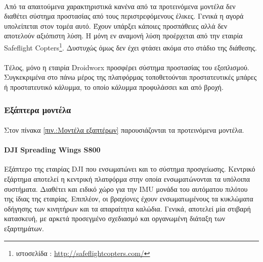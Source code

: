 \documentclass[a4paper, 12pt, twoside]{report}
\begin{document}
{{{{{{			\paragraph{}{Από τα απαιτούμενα χαρακτηριστικά κανένα από τα προτεινόμενα μοντέλα δεν διαθέτει σύστημα προστασίας από τους περιστρεφόμενους έλικες. Γενικά η αγορά υπολείπεται στον τομέα αυτό. Έχουν υπάρξει κάποιες προσπάθειες αλλά δεν αποτελούν αξιόπιστη λύση. Η μόνη εν αναμονή λύση προέρχεται από την εταιρία Safeflight Copters\footnote{ιστοσελίδα : \url{http://safeflightcopters.com/}}. Δυστυχώς όμως δεν έχει φτάσει ακόμα στο στάδιο της διάθεσης.
			}
			\paragraph{}{Τέλος, μόνο η εταιρία Droidworx προσφέρει σύστημα προστασίας του εξοπλισμού. Συγκεκριμένα στο πάνω μέρος της πλατφόρμας τοποθετούνται προστατευτικές μπάρες ή προστατευτικό κάλυμμα, το οποίο κάλυμμα προφυλάσσει και από βροχή.
			}
			
		\subsubsection{Εξάπτερα μοντέλα}
			\paragraph{}{Στον πίνακα \ref{πιν.:Μοντέλα εξαπτέρων} παρουσιάζονται τα προτεινόμενα μοντέλα.
			}
			\paragraph{DJI Spreading Wings S800}{Εξάπτερο της εταιρίας DJI που ενσωματώνει και το σύστημα προσγείωσης. Κεντρικό εξάρτημα αποτελεί η κεντρική πλατφόρμα στην οποία ενσωματώνονται τα υπόλοιπα συστήματα. Διαθέτει και ειδικό χώρο για την IMU μονάδα του αυτόματου πιλότου της ίδιας της εταιρίας. Επιπλέον, οι βραχίονες έχουν ενσωματωμένους τα κυκλώματα οδήγησης των κινητήρων και τα απαραίτητα καλώδια. Γενικά, αποτελεί μία στιβαρή κατασκευή, με αρκετά προσεγμένο σχεδιασμό και οργανωμένη διάταξη των εξαρτημάτων.
			}
}}}}}}
\end{document}
